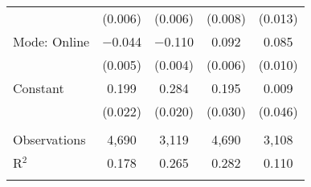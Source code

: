 \begin{table}[!htbp]
\begin{tabular}{@{\extracolsep{0pt}}lcccc}
  & (0.006) & (0.006) & (0.008) & (0.013) \\ 
  Mode: Online & $-$0.044 & $-$0.110 & 0.092 & 0.085 \\ 
  & (0.005) & (0.004) & (0.006) & (0.010) \\ 
  Constant & 0.199 & 0.284 & 0.195 & 0.009 \\ 
  & (0.022) & (0.020) & (0.030) & (0.046) \\ 
 \hline \\[-1.8ex] 
Observations & 4,690 & 3,119 & 4,690 & 3,108 \\ 
R$^{2}$ & 0.178 & 0.265 & 0.282 & 0.110 \\ 
\hline 
\hline \\[-1.8ex] 
\end{tabular} 
\end{table} 
